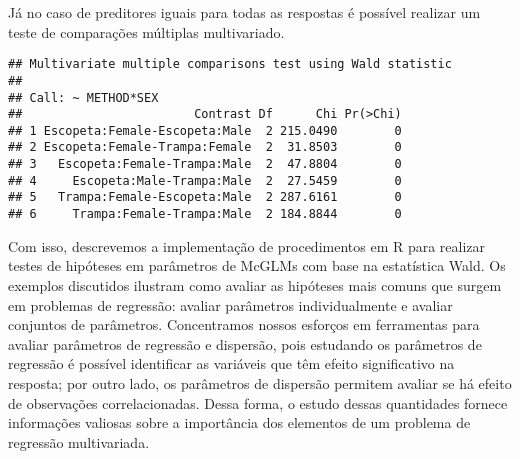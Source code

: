 Já no caso de preditores iguais para todas as respostas é possível realizar um teste de comparações múltiplas multivariado.

\begin{knitrout}
\color{fgcolor}\begin{kframe}
\begin{alltt}
\hlstd{(} 
                  \hlstd{=} \hlstd{(}\hlstd{,} \hlstd{),}
                  
\end{alltt}
\begin{verbatim}
## Multivariate multiple comparisons test using Wald statistic
## 
## Call: ~ METHOD*SEX
##                        Contrast Df      Chi Pr(>Chi)
## 1 Escopeta:Female-Escopeta:Male  2 215.0490        0
## 2 Escopeta:Female-Trampa:Female  2  31.8503        0
## 3   Escopeta:Female-Trampa:Male  2  47.8804        0
## 4     Escopeta:Male-Trampa:Male  2  27.5459        0
## 5   Trampa:Female-Escopeta:Male  2 287.6161        0
## 6     Trampa:Female-Trampa:Male  2 184.8844        0
\end{verbatim}
\end{kframe}
\end{knitrout}



Com isso, descrevemos a implementação de procedimentos em R para realizar testes de hipóteses em parâmetros de McGLMs com base na estatística Wald. Os exemplos discutidos ilustram como avaliar as hipóteses mais comuns que surgem em problemas de regressão: avaliar parâmetros individualmente e avaliar conjuntos de parâmetros. Concentramos nossos esforços em ferramentas para avaliar parâmetros de regressão e dispersão, pois estudando os parâmetros de regressão é possível identificar as variáveis que têm efeito significativo na resposta; por outro lado, os parâmetros de dispersão permitem avaliar se há efeito de observações correlacionadas. Dessa forma, o estudo dessas quantidades fornece informações valiosas sobre a importância dos elementos de um problema de regressão multivariada.
